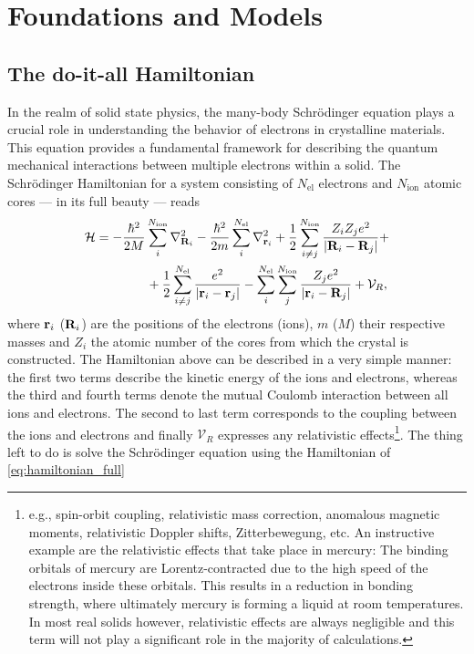 \documentclass[\main/main.tex]{subfiles}
\begin{document}
\chapter{Foundations and Models}

\section{The do-it-all Hamiltonian}

In the realm of solid state physics, the many-body Schrödinger equation plays a crucial role in understanding the behavior of electrons in crystalline materials. This equation provides a fundamental framework for describing the quantum mechanical interactions between multiple electrons within a solid. The Schrödinger Hamiltonian for a system consisting of $N_{\text{el}}$ electrons and $N_{\text{ion}}$ atomic cores --- in its full beauty --- reads
\begin{align}\label{eq:hamiltonian_full}
\begin{split}
        \mathcal{H}&=-\frac{\hbar^2}{2M}\sum_{i}^{N_{\text{ion}}}\nabla^2_{\textbf{R}_i}-\frac{\hbar^2}{2m}\sum_{i}^{N_{\text{el}}}\nabla^2_{\textbf{r}_i}+\frac{1}{2}\sum_{i\neq j}^{N_{\text{ion}}}\frac{Z_i Z_j e^2}{|\textbf{R}_i-\textbf{R}_j|}+\\
        &\qquad\qquad+\frac{1}{2}\sum_{i\neq j}^{N_{\text{el}}}\frac{e^2}{|\textbf{r}_i-\textbf{r}_j|}-\sum_i^{N_{\text{el}}}\sum_j^{N_{\text{ion}}}\frac{Z_j e^2}{|\textbf{r}_i-\textbf{R}_j|}+\mathcal{V}_R,  
\end{split}
\end{align}
where $\textbf{r}_i$ ($\textbf{R}_i$) are the positions of the electrons (ions), $m$ ($M$) their respective masses and $Z_i$ the atomic number of the cores from which the crystal is constructed. The Hamiltonian above can be described in a very simple manner: the first two terms describe the kinetic energy of the ions and electrons, whereas the third and fourth terms denote the mutual Coulomb interaction between all ions and electrons. The second to last term corresponds to the coupling between the ions and electrons and finally $\mathcal{V}_R$ expresses any relativistic effects\footnote{e.g., spin-orbit coupling, relativistic mass correction, anomalous magnetic moments, relativistic Doppler shifts, Zitterbewegung, etc. An instructive example are the relativistic effects that take place in mercury: The binding orbitals of mercury are Lorentz-contracted due to the high speed of the electrons inside these orbitals. This results in a reduction in bonding strength, where ultimately mercury is forming a liquid at room temperatures. In most real solids however, relativistic effects are always negligible and this term will not play a significant role in the majority of calculations.}. The  thing left to do is solve the Schrödinger equation using the Hamiltonian of \eqref{eq:hamiltonian_full}
\end{document}

